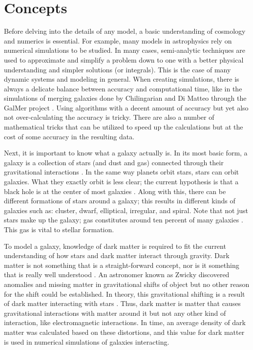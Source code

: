 \documentclass[11pt]{article} %
\begin{document}
\section{Concepts}
	Before delving into the details of any model, a basic understanding of cosmology and numerics is essential. For example, many models in astrophysics rely on numerical simulations to be studied. In many cases, semi-analytic techniques are used to approximate and simplify a problem down to one with a better physical understanding and simpler solutions (or integrals). This is the case of many dynamic systems and modeling in general. When creating simulations, there is always a delicate balance between accuracy and computational time, like in the simulations of merging galaxies done by Chilingarian and Di Matteo through the GalMer project \cite{GalMer}. Using algorithms with a decent amount of accuracy but yet also not over-calculating the accuracy is tricky. There are also a number of mathematical tricks that can be utilized to speed up the calculations but at the cost of some accuracy in the resulting data.

	Next, it is important to know what a galaxy actually is. In its most basic form, a galaxy is a collection of stars (and dust and gas) connected through their gravitational interactions \cite{galaxy}. In the same way planets orbit stars, stars can orbit galaxies. What they exactly orbit is less clear; the current hypothesis is that a black hole is at the center of most galaxies \cite{galaxy}. Along with this, there can be different formations of stars around a galaxy; this results in different kinds of galaxies such as: cluster, dwarf, elliptical, irregular, and spiral. Note that not just stars make up the galaxy; gas constitutes around ten percent of many galaxies \cite{starburst}. This gas is vital to stellar formation.

	To model a galaxy, knowledge of dark matter is required to fit the current understanding of how stars and dark matter interact through gravity. Dark matter is not something that is a straight-forward concept, nor is it something that is really well understood \cite{modelsintime}. An astronomer known as Zwicky discovered anomalies and missing matter in gravitational shifts of object but no other reason for the shift could be established. In theory, this gravitational shifting is a result of dark matter interacting with stars \cite{modelsintime}. Thus, dark matter is matter that causes gravitational interactions with matter around it but not any other kind of interaction, like electromagnetic interactions. In time, an average density of dark matter was calculated based on these distortions, and this value for dark matter is used in numerical simulations of galaxies interacting.
\end{document}
